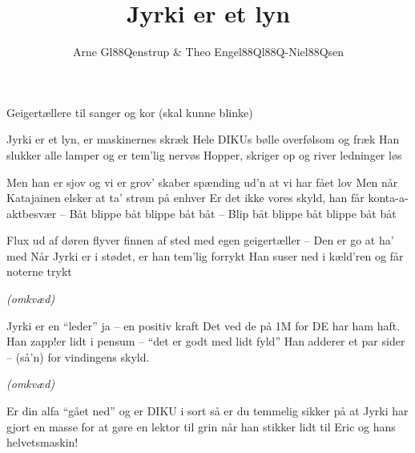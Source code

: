 \documentclass[10pt]{article}
\title{Jyrki er et lyn}
\author{Arne Gl88Qenstrup \& Theo Engel88Ql88Q-Niel88Qsen}
\begin{document}
\maketitle
\begin{roles}
   Geigertællere til sanger og kor (skal kunne blinke)
\end{roles}

\begin{song}
 Jyrki er et lyn,
er maskinernes skræk
Hele DIKUs bølle
overfølsom og fræk
Han slukker alle lamper og er tem'lig nervøs
Hopper, skriger op og river ledninger løs

 Men han er sjov
og vi er grov'
skaber spænding ud'n at vi har fået lov
Men når Katajainen elsker at ta' strøm på enhver
Er det ikke vores skyld, han får konta-a-aktbesvær
-- Båt blippe båt blippe båt båt
-- Blip båt blippe båt blippe båt båt

 Flux ud af døren
flyver finnen af sted
med egen geigertæller
-- Den er go at ha' med
Når Jyrki er i stødet, er han tem'lig forrykt
Han suser ned i kæld'ren og får noterne trykt 

{\em (omkvæd)}

Jyrki er en ``leder''
ja -- en positiv kraft
Det ved de på 1M
for DE har ham haft.
Han zapp!er lidt i pensum -- ``det er godt med lidt fyld''
Han adderer et par sider -- (så'n) for vindingens skyld.

{\em (omkvæd)}

Er din alfa ``gået ned''
og er DIKU i sort
så er du temmelig sikker
på at Jyrki har gjort
en masse for at gøre en lektor til grin
når han stikker lidt til Eric og hans helvetsmaskin!

\end{song}
\end{document}

